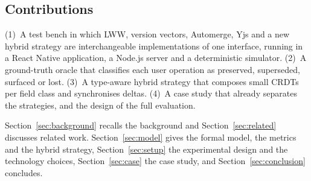 \subsection{Contributions}
(1)~A test bench in which LWW, version vectors, Automerge, Yjs and a new hybrid strategy are interchangeable
implementations of one interface, running in a React Native application, a Node.js server and a deterministic
simulator. (2)~A ground-truth oracle that classifies each user operation as preserved, superseded, surfaced or lost.
(3)~A type-aware hybrid strategy that composes small CRDTs per field class and synchronises deltas. (4)~A case study
that already separates the strategies, and the design of the full evaluation.

Section~\ref{sec:background} recalls the background and Section~\ref{sec:related} discusses related work.
Section~\ref{sec:model} gives the formal model, the metrics and the hybrid strategy, Section~\ref{sec:setup} the
experimental design and the technology choices, Section~\ref{sec:case} the case study, and
Section~\ref{sec:conclusion} concludes.
